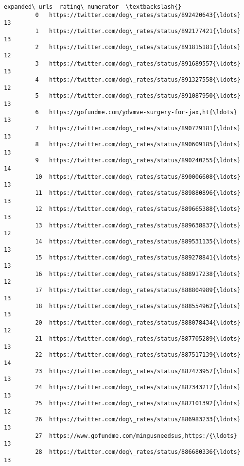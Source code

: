\documentclass[11pt]{article}
\begin{document}
\begin{Verbatim}[commandchars=\\\{\}]
                                                 expanded\_urls  rating\_numerator  \textbackslash{}
         0   https://twitter.com/dog\_rates/status/892420643{\ldots}                13   
         1   https://twitter.com/dog\_rates/status/892177421{\ldots}                13   
         2   https://twitter.com/dog\_rates/status/891815181{\ldots}                12   
         3   https://twitter.com/dog\_rates/status/891689557{\ldots}                13   
         4   https://twitter.com/dog\_rates/status/891327558{\ldots}                12   
         5   https://twitter.com/dog\_rates/status/891087950{\ldots}                13   
         6   https://gofundme.com/ydvmve-surgery-for-jax,ht{\ldots}                13   
         7   https://twitter.com/dog\_rates/status/890729181{\ldots}                13   
         8   https://twitter.com/dog\_rates/status/890609185{\ldots}                13   
         9   https://twitter.com/dog\_rates/status/890240255{\ldots}                14   
         10  https://twitter.com/dog\_rates/status/890006608{\ldots}                13   
         11  https://twitter.com/dog\_rates/status/889880896{\ldots}                13   
         12  https://twitter.com/dog\_rates/status/889665388{\ldots}                13   
         13  https://twitter.com/dog\_rates/status/889638837{\ldots}                12   
         14  https://twitter.com/dog\_rates/status/889531135{\ldots}                13   
         15  https://twitter.com/dog\_rates/status/889278841{\ldots}                13   
         16  https://twitter.com/dog\_rates/status/888917238{\ldots}                12   
         17  https://twitter.com/dog\_rates/status/888804989{\ldots}                13   
         18  https://twitter.com/dog\_rates/status/888554962{\ldots}                13   
         20  https://twitter.com/dog\_rates/status/888078434{\ldots}                12   
         21  https://twitter.com/dog\_rates/status/887705289{\ldots}                13   
         22  https://twitter.com/dog\_rates/status/887517139{\ldots}                14   
         23  https://twitter.com/dog\_rates/status/887473957{\ldots}                13   
         24  https://twitter.com/dog\_rates/status/887343217{\ldots}                13   
         25  https://twitter.com/dog\_rates/status/887101392{\ldots}                12   
         26  https://twitter.com/dog\_rates/status/886983233{\ldots}                13   
         27  https://www.gofundme.com/mingusneedsus,https:/{\ldots}                13   
         28  https://twitter.com/dog\_rates/status/886680336{\ldots}                13   

\end{Verbatim}
\end{document}
